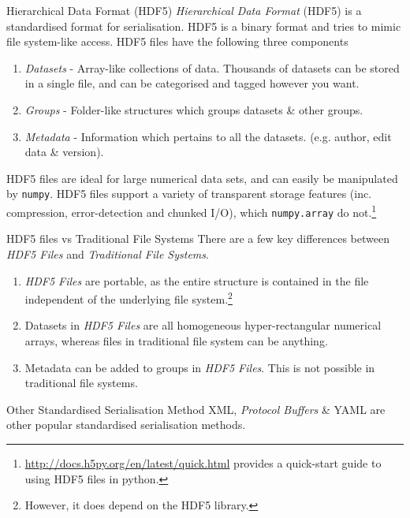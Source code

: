 \documentclass[11pt,a4paper]{article}
\begin{document}
  \begin{definition}{Hierarchical Data Format (HDF5)}
    \textit{Hierarchical Data Format} (HDF5) is a standardised format for serialisation. HDF5 is a binary format and tries to mimic  file system-like access. HDF5 files have the following three components
    \begin{enumerate}
      \item \textit{Datasets} - Array-like collections of data. Thousands of datasets can be stored in a single file, and can be categorised and tagged however you want.
      \item \textit{Groups} - Folder-like structures which groups datasets \& other groups.
      \item \textit{Metadata} - Information which pertains to all the datasets. (e.g. author, edit data \& version).
    \end{enumerate}
    \par HDF5 files are ideal for large numerical data sets, and can easily be manipulated by \texttt{numpy}. HDF5 files support a variety of transparent storage features (inc. compression, error-detection and chunked I/O), which \texttt{numpy.array} do not.\footnote{\url{http://docs.h5py.org/en/latest/quick.html} provides a quick-start guide to using HDF5 files in python.}
  \end{definition}

  \begin{proposition}{HDF5 files vs Traditional File Systems}
    There are a few key differences between \textit{HDF5 Files} and \textit{Traditional File Systems}.
    \begin{enumerate}
      \item \textit{HDF5 Files} are portable, as the entire structure is contained in the file independent of the underlying file system.\footnote{However, it does depend on the HDF5 library.}
      \item Datasets in \textit{HDF5 Files} are all homogeneous hyper-rectangular numerical arrays, whereas files in traditional file system can be anything.
      \item Metadata can be added to groups in \textit{HDF5 Files}. This is not possible in traditional file systems.
    \end{enumerate}
  \end{proposition}

  \begin{remark}{Other Standardised Serialisation Method}
    XML, \textit{Protocol Buffers} \& YAML are other popular standardised serialisation methods.
  \end{remark}
\end{document}
